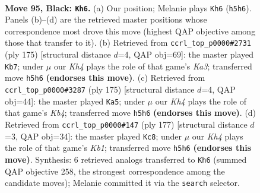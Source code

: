 \documentclass[11pt]{article}
\begin{document}
\clearpage

\begin{figure}[p]\centering
\begin{subfigure}{0.46\textwidth}\centering
\resizebox{\linewidth}{!}{%
\newchessgame
\chessboard[
  setfen={8/8/8/1R5k/8/7K/5p2/3r4 b - - 5 95},
  showmover=false,
  pgfstyle=straightmove, color=movearrow, markmove={h5-h6}
]}
\caption{}
\end{subfigure}\hfill
\begin{subfigure}{0.46\textwidth}\centering
\resizebox{\linewidth}{!}{%
\newchessgame
\chessboard[
  setfen={8/8/k5R1/7p/1K5P/8/8/4r3 b - - 14 88},
  showmover=false,
  pgfstyle=straightmove, color=movearrow, markmove={a6-b7}
]}
\caption{}
\end{subfigure}
\\[4pt]
\begin{subfigure}{0.46\textwidth}\centering
\resizebox{\linewidth}{!}{%
\newchessgame
\chessboard[
  setfen={8/8/3r4/1k6/8/4p1K1/4P3/1R6 b - - 19 88},
  showmover=false,
  pgfstyle=straightmove, color=movearrow, markmove={b5-a5}
]}
\caption{}
\end{subfigure}\hfill
\begin{subfigure}{0.46\textwidth}\centering
\resizebox{\linewidth}{!}{%
\newchessgame
\chessboard[
  setfen={1k6/8/8/1R6/2r5/8/4K3/8 b - - 9 89},
  showmover=false,
  pgfstyle=straightmove, color=movearrow, markmove={b8-c8}
]}
\caption{}
\end{subfigure}
\caption{\textbf{Move 95, Black: \texttt{Kh6}.} (a) Our position; Melanie plays \texttt{Kh6} (\texttt{h5h6}). Panels (b)--(d) are the retrieved master positions whose correspondence most drove this move (highest QAP objective among those that transfer to it). (b) Retrieved from \texttt{ccrl\_top\_p0000\#2731} (ply 175) [structural distance $d$=4, QAP obj=69]: the master played \texttt{Kb7}; under $\mu$ our \emph{Kh4} plays the role of that game's \emph{Ka3}; transferred move \texttt{h5h6} \textbf{(endorses this move)}. (c) Retrieved from \texttt{ccrl\_top\_p0000\#3287} (ply 175) [structural distance $d$=4, QAP obj=44]: the master played \texttt{Ka5}; under $\mu$ our \emph{Kh4} plays the role of that game's \emph{Kb4}; transferred move \texttt{h5h6} \textbf{(endorses this move)}. (d) Retrieved from \texttt{ccrl\_top\_p0000\#147} (ply 177) [structural distance $d$=3, QAP obj=34]: the master played \texttt{Kc8}; under $\mu$ our \emph{Kh4} plays the role of that game's \emph{Kb1}; transferred move \texttt{h5h6} \textbf{(endorses this move)}. Synthesis: 6 retrieved analogs transferred to \texttt{Kh6} (summed QAP objective 258, the strongest correspondence among the candidate moves); Melanie committed it via the \texttt{search} selector.}
\label{fig:thought-m189}
\end{figure}
\end{document}
